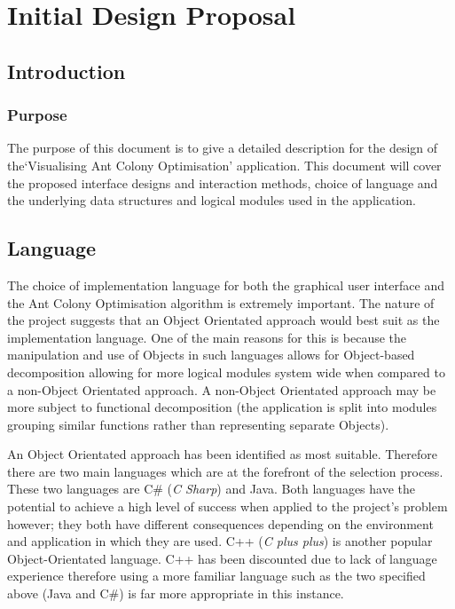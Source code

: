 \chapter{Initial Design Proposal}
\renewcommand{\thechapter}{\Alph{chapter}}
\section{Introduction}

\subsection{Purpose}

The purpose of this document is to give a detailed description for the design of the`Visualising Ant Colony Optimisation' application. This document will cover the proposed interface designs and interaction methods, choice of language and the underlying data structures and logical modules used in the application.

\section{Language}

The choice of implementation language for both the graphical user interface and the Ant Colony Optimisation algorithm is extremely important. The nature of the project suggests that an Object Orientated approach would best suit as the implementation language. One of the main reasons for this is because the manipulation and use of Objects in such languages allows for Object-based decomposition allowing for more logical modules system wide when compared to a non-Object Orientated approach. A non-Object Orientated approach may be more subject to functional decomposition (the application is split into modules grouping similar functions rather than representing separate Objects).

An Object Orientated approach has been identified as most suitable. Therefore there are two main languages which are at the forefront of the selection process. These two languages are C\# (\textit{C Sharp}) and Java. Both languages have the potential to achieve a high level of success when applied to the project’s problem however; they both have different consequences depending on the environment and application in which they are used. C++ (\textit{C plus plus}) is another popular Object-Orientated language.  C++ has been discounted due to lack of language experience therefore using a more familiar language such as the two specified above (Java and C\#) is far more appropriate in this instance. 

